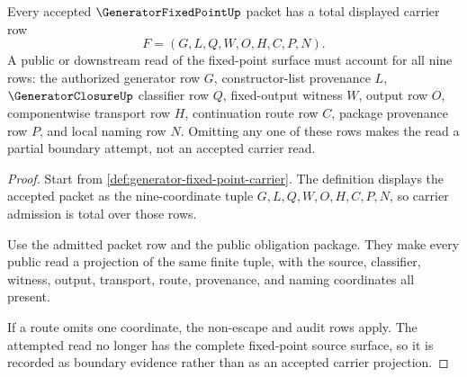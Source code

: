 \begin{theorem}
\label{thm:generator-fixed-point-carrier-row-totality}
Every accepted $\GeneratorFixedPointUp$ packet has a total displayed carrier row
$$
F=(G,L,Q,W,O,H,C,P,N).
$$
A public or downstream read of the fixed-point surface must account for all nine rows: the authorized generator row $G$, constructor-list provenance $L$, $\GeneratorClosureUp$ classifier row $Q$, fixed-output witness $W$, output row $O$, componentwise transport row $H$, continuation route row $C$, package provenance row $P$, and local naming row $N$. Omitting any one of these rows makes the read a partial boundary attempt, not an accepted carrier read.
\end{theorem}
\begin{proof}
Start from \autoref{def:generator-fixed-point-carrier}. The definition displays the accepted packet as the nine-coordinate tuple $G,L,Q,W,O,H,C,P,N$, so carrier admission is total over those rows.

Use the admitted packet row and the public obligation package. They make every public read a projection of the same finite tuple, with the source, classifier, witness, output, transport, route, provenance, and naming coordinates all present.

If a route omits one coordinate, the non-escape and audit rows apply. The attempted read no longer has the complete fixed-point source surface, so it is recorded as boundary evidence rather than as an accepted carrier projection.
\end{proof}

